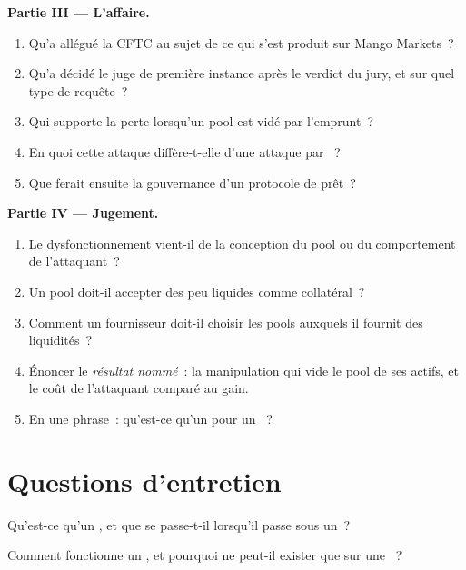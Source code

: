 \begin{problem}
\medskip\noindent\textbf{Partie III --- L'affaire.}
\begin{enumerate}[resume]
\item Qu'a allégué la CFTC au sujet de ce qui s'est produit sur Mango Markets~?
\item Qu'a décidé le juge de première instance après le verdict du jury, et sur quel type de requête~?
\item Qui supporte la perte lorsqu'un pool est vidé par l'emprunt~?
\item En quoi cette attaque diffère-t-elle d'une attaque par ~?
\item Que ferait ensuite la gouvernance d'un protocole de prêt~?
\end{enumerate}

\medskip\noindent\textbf{Partie IV --- Jugement.}
\begin{enumerate}[resume]
\item Le dysfonctionnement vient-il de la conception du pool ou du comportement de l'attaquant~?
\item Un pool doit-il accepter des  peu liquides comme collatéral~?
\item Comment un fournisseur doit-il choisir les pools auxquels il fournit des liquidités~?
\item Énoncer le \emph{résultat nommé}~: la manipulation qui vide le pool de ses actifs, et le coût de l'attaquant comparé au gain.
\item En une phrase~: qu'est-ce qu'un  pour un ~?
\end{enumerate}
\end{problem}

\section{Questions d'entretien}

\begin{interviewq}\label{iq:m3:defi-credit-and-leverage:1}
Qu'est-ce qu'un , et que se passe-t-il lorsqu'il passe sous un~?
\end{interviewq}

\begin{interviewq}\label{iq:m3:defi-credit-and-leverage:2}
Comment fonctionne un , et pourquoi ne peut-il exister que sur une ~?
\end{interviewq}

